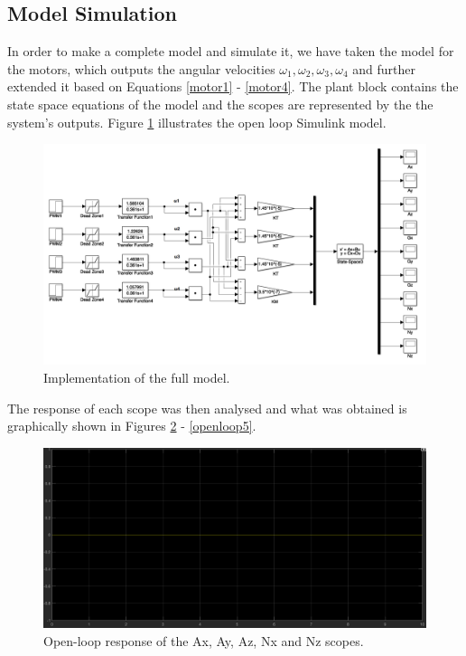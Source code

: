 \subsection{Model Simulation}
In order to make a complete model and simulate it, we have taken the model for the motors, which outputs the angular velocities $\omega_{1}, \omega_{2}, \omega_{3}, \omega_{4}$ and further extended it based on Equations \ref{motor1} - \ref{motor4}. The plant block contains the state space equations of the model and the scopes are represented by the the system's outputs. Figure \ref{openloop} illustrates the open loop Simulink model.

\begin{figure}[H]
  \centering
    \includegraphics[width=1\textwidth]{images/openloop.png}
	\caption{Implementation of the full model.}
	\label{openloop}
\end{figure}

The response of each scope was then analysed and what was obtained is graphically shown in Figures \ref{openloop1} - \ref{openloop5}. 

\begin{figure}[H]
  \centering
    \includegraphics[width=1\textwidth]{images/Ax.png}
	\caption{Open-loop response of the Ax, Ay, Az, Nx and Nz scopes.}
	\label{openloop1}
\end{figure}

